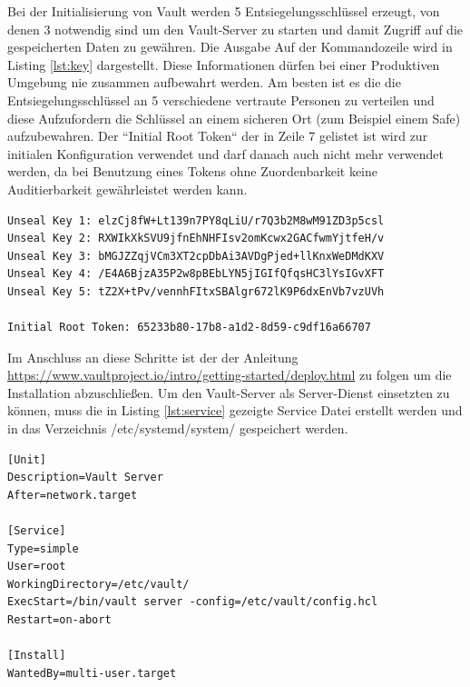 \documentclass[
book,
a4paper,   
titlepage,  
halfparskip,
12pt        
]{scrartcl}
\begin{document}
\begin{onehalfspacing}
Bei der Initialisierung von Vault werden 5 Entsiegelungsschlüssel erzeugt, von denen 3 notwendig sind um den Vault-Server zu starten und damit Zugriff auf die gespeicherten Daten zu gewähren. Die Ausgabe Auf der Kommandozeile wird in Listing \vref{lst:key} dargestellt.
Diese Informationen dürfen bei einer Produktiven Umgebung nie zusammen aufbewahrt werden. Am besten ist es die die Entsiegelungsschlüssel an 5 verschiedene vertraute Personen zu verteilen und diese Aufzufordern die Schlüssel an einem sicheren Ort (zum Beispiel einem Safe) aufzubewahren. Der ``Initial Root Token`` der in Zeile 7 gelistet ist wird zur initialen Konfiguration verwendet und darf danach auch nicht mehr verwendet werden, da bei Benutzung eines Tokens ohne Zuordenbarkeit keine Auditierbarkeit gewährleistet werden kann.

\begin{lstlisting}[caption={[Initialisierung Vault] Ausgabe der 5 Schlüsselfragmente von denen 3 nötig sind um den Hauptschlüssel zu rekonstruieren}, label=lst:key, captionpos=b, basicstyle=\ttfamily]
Unseal Key 1: elzCj8fW+Lt139n7PY8qLiU/r7Q3b2M8wM91ZD3p5csl
Unseal Key 2: RXWIkXkSVU9jfnEhNHFIsv2omKcwx2GACfwmYjtfeH/v
Unseal Key 3: bMGJZZqjVCm3XT2cpDbAi3AVDgPjed+llKnxWeDMdKXV
Unseal Key 4: /E4A6BjzA35P2w8pBEbLYN5jIGIfQfqsHC3lYsIGvXFT
Unseal Key 5: tZ2X+tPv/vennhFItxSBAlgr672lK9P6dxEnVb7vzUVh

Initial Root Token: 65233b80-17b8-a1d2-8d59-c9df16a66707

\end{lstlisting}


Im Anschluss an diese Schritte ist der der Anleitung \url{https://www.vaultproject.io/intro/getting-started/deploy.html} zu folgen um die Installation abzuschließen. Um den Vault-Server als Server-Dienst einsetzten zu können, muss die in Listing \vref{lst:service} gezeigte Service Datei erstellt werden und in das Verzeichnis /etc/systemd/system/ gespeichert werden.

\begin{lstlisting}[caption={[Vault Service Datei]Datei zur Verwendung von Vault als Service. Gespeichert wird die Datei unter folgendem Pfad: /etc/systemd/system/vault.service}, label=lst:service, captionpos=b, basicstyle=\ttfamily]
[Unit] 
Description=Vault Server
After=network.target

[Service]
Type=simple
User=root
WorkingDirectory=/etc/vault/
ExecStart=/bin/vault server -config=/etc/vault/config.hcl
Restart=on-abort

[Install]
WantedBy=multi-user.target
\end{lstlisting}


\end{onehalfspacing}
\end{document}
